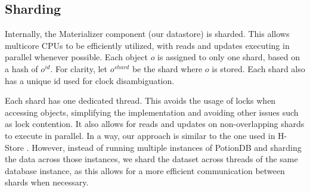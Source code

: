 \documentclass{vldb}
\begin{document}

\subsection{Sharding}
\label{subsec:sharding}


Internally, the Materializer component (our datastore) is sharded.
This allows multicore CPUs to be efficiently utilized,
with reads and updates executing in parallel whenever possible.
Each object $o$ is assigned to only one shard, based on a hash of $o^{\mathit{id}}$.
For clarity, let $o^{\mathit{shard}}$ be the shard where $o$ is stored.
Each shard also has a unique id used for clock disambiguation.

Each shard has one dedicated thread.
This avoids the usage of locks when accessing objects, simplifying the implementation and avoiding other issues such as lock contention.
It also allows for reads and updates on non-overlapping shards to execute in parallel.
In a way, our approach is similar to the one used in H-Store \cite{h-store}.
However, instead of running multiple instances of PotionDB and sharding the data across those instances, we shard the dataset across threads of the same database instance, as this allows for a more efficient communication between shards when necessary.

\end{document}
